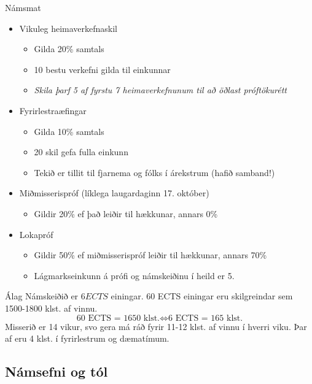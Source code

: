 \documentclass{beamer}
\begin{document}
\begin{frame}{Námsmat}
\begin{itemize}
 \item Vikuleg heimaverkefnaskil
 \begin{itemize}
  \item Gilda 20\% samtals
  \item 10 bestu verkefni gilda til einkunnar
  \item \emph{Skila þarf 5 af fyrstu 7 heimaverkefnunum til að öðlast próftökurétt}
 \end{itemize}
 \item Fyrirlestraæfingar
 \begin{itemize}
  \item Gilda 10\% samtals
  \item 20 skil gefa fulla einkunn
  \item Tekið er tillit til fjarnema og fólks í árekstrum (hafið samband!)
 \end{itemize}
 \item Miðmisserispróf (líklega laugardaginn 17. október)
 \begin{itemize}
  \item Gildir 20\% ef það leiðir til hækkunar, annars 0\%
 \end{itemize}
 \item Lokapróf
 \begin{itemize}
  \item Gildir 50\% ef miðmisserispróf leiðir til hækkunar, annars 70\%
  \item Lágmarkseinkunn á prófi og námskeiðinu í heild er 5.
 \end{itemize}
\end{itemize}
\end{frame}

\begin{frame}{Álag}
Námskeiðið er $6 ECTS$ einingar. 60 ECTS einingar eru skilgreindar sem 1500-1800 klst. af vinnu.
\[
\text{60 ECTS = 1650 klst.} \Longleftrightarrow \text{6 ECTS = 165 klst.}
\]
Misserið er 14 vikur, svo gera má ráð fyrir 11-12 klst. af vinnu í hverri viku. Þar af eru 4 klst. í fyrirlestrum og dæmatímum.
\end{frame}

\subsection{Námsefni og tól}
\end{document}
